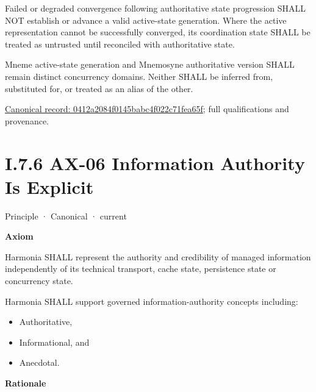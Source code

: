 Failed or degraded convergence following authoritative state progression SHALL NOT establish or advance a valid active-state generation. Where the active representation cannot be successfully converged, its coordination state SHALL be treated as untrusted until reconciled with authoritative state.



Mneme active-state generation and Mnemosyne authoritative version SHALL remain distinct concurrency domains. Neither SHALL be inferred from, substituted for, or treated as an alias of the other.


{\footnotesize \href{../../../../../../../../continuum/motivation/principle/0412a2084f0145babc4f022c71fea65f.md}{Canonical record: 0412a2084f0145babc4f022c71fea65f}; full qualifications and provenance.}\par
\section*{I.7.6 AX-06 Information Authority Is Explicit}
\label{navigation:I.7.6}

\label{element:952c3b6148ce4fce94b69f99a0c2fec7}
{\small Principle · Canonical · current}\par

\par\medskip\textbf{Axiom}\par


Harmonia SHALL represent the authority and credibility of managed
information independently of its technical transport, cache state,
persistence state or concurrency state.



Harmonia SHALL support governed information-authority concepts including:



\begin{itemize}


\item Authoritative,

\item Informational, and

\item Anecdotal.

\end{itemize}


\par\medskip\textbf{Rationale}\par


